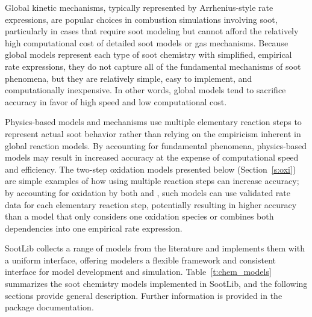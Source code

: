 \documentclass[preprint,letterpaper]{elsarticle}
\begin{document}
Global kinetic mechanisms, typically represented by Arrhenius-style rate expressions, are popular choices in combustion simulations involving soot, particularly in cases that require soot modeling but cannot afford the relatively high computational cost of detailed soot models or gas mechanisms. Because global models represent each type of soot chemistry with simplified, empirical rate expressions, they do not capture all of the fundamental mechanisms of soot phenomena, but they are relatively simple, easy to implement, and computationally inexpensive. In other words, global models tend to sacrifice accuracy in favor of high speed and low computational cost.

Physics-based models and mechanisms use multiple elementary reaction steps to represent actual soot behavior rather than relying on the empiricism inherent in global reaction models. By accounting for fundamental phenomena, physics-based models may result in increased accuracy at the expense of computational speed and efficiency. The two-step oxidation models presented below (Section~\ref{s:oxi}) are simple examples of how using multiple reaction steps can increase accuracy; by accounting for oxidation by both  and , such models can use validated rate data for each elementary reaction step, potentially resulting in higher accuracy than a model that only considers one oxidation species or combines both dependencies into one empirical rate expression.

SootLib collects a range of models from the literature and implements them with a uniform interface, offering modelers a flexible framework and consistent interface for model development and simulation. Table~\ref{t:chem_models} summarizes the soot chemistry models implemented in SootLib, and the following sections provide general description. Further information is provided in the package documentation.
\end{document}
